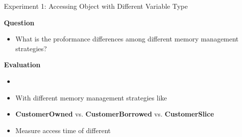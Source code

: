 \documentclass[9pt]{beamer}
\begin{document}

\begin{frame}[fragile]{Experiment 1: Accessing Object with Different Variable Type}

    \textbf{Question}
    \begin{itemize}
        \item What is the proformance differences among different memory management strategies?
    \end{itemize}

    \vspace{0.5cm}

    \textbf{Evaluation}
    \begin{itemize}
        \item {}
        \item With different memory management strategies like 
        \item \textbf{CustomerOwned} vs. \textbf{CustomerBorrowed} vs. \textbf{CustomerSlice}
        \item Measure access time of different 
    \end{itemize}

\end{frame}

% 
% 

\end{document}

